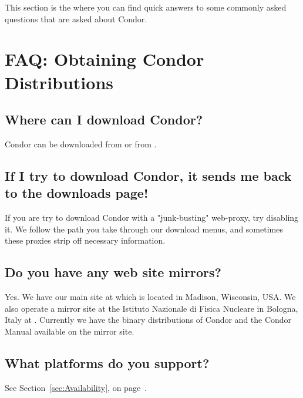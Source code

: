 This section is the where you can find quick answers to some commonly
asked questions that are asked about Condor.

\section{FAQ: Obtaining Condor Distributions}

\subsection{Where can I download Condor?}
Condor can be downloaded from  or from
.

\subsection{If I try to download Condor, it sends me back to the downloads page!}

If you are try to download Condor with a "junk-busting" web-proxy, try disabling it.
We follow the path you take through our download menus, and sometimes these proxies strip off necessary information.

\subsection{Do you have any web site mirrors?}

Yes.  We have our main site at 
which is located in Madison, Wisconsin, USA.  We also operate a mirror
site at the Istituto Nazionale di Fisica Nucleare in Bologna, Italy
at .  Currently we have the 
binary distributions of Condor and the Condor Manual available on the
mirror site.


\subsection{What platforms do you support?}

See Section~\ref{sec:Availability}, on page~\pageref{sec:Availability}.

